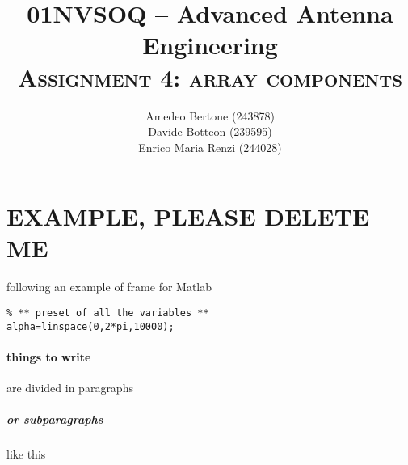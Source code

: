 \documentclass[11pt,a4paper,oneside,openright]{article}
\title{	01NVSOQ -- Advanced Antenna Engineering \\
	\huge {\textsc{Assignment 4: array components}}	}
\begin{document}
\author{Amedeo Bertone (243878)\\Davide Botteon (239595)\\Enrico Maria Renzi (244028)\\
}
\maketitle 		
\tableofcontents






\section{EXAMPLE, PLEASE DELETE ME}
following an example of frame for Matlab
\begin{lstlisting}
% ** preset of all the variables **
alpha=linspace(0,2*pi,10000);
\end{lstlisting}
\paragraph{things to write} are divided in paragraphs
\subparagraph{or subparagraphs} like this
\end{document}

